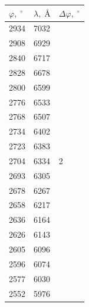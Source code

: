 \documentclass[a4paper]{article}
\renewcommand{\phi}{\varphi}
\newcommand{\angstrom}{\text{\AA}}
\begin{document}
	\begin{table}[h]
		\centering
	\begin{tabular}{|l|l|l|}
		\hline
		$\phi, \;^\circ$ & $\lambda, \;\angstrom$ & $\Delta \phi, \;^\circ$ \\ \hline
		2934             & 7032                   & \multirow{33}{*}{2}     \\ \cline{1-2}
		2908             & 6929                   &                         \\ \cline{1-2}
		2840             & 6717                   &                         \\ \cline{1-2}
		2828             & 6678                   &                         \\ \cline{1-2}
		2800             & 6599                   &                         \\ \cline{1-2}
		2776             & 6533                   &                         \\ \cline{1-2}
		2768             & 6507                   &                         \\ \cline{1-2}
		2734             & 6402                   &                         \\ \cline{1-2}
		2723             & 6383                   &                         \\ \cline{1-2}
		2704             & 6334                   &                         \\ \cline{1-2}
		2693             & 6305                   &                         \\ \cline{1-2}
		2678             & 6267                   &                         \\ \cline{1-2}
		2658             & 6217                   &                         \\ \cline{1-2}
		2636             & 6164                   &                         \\ \cline{1-2}
		2626             & 6143                   &                         \\ \cline{1-2}
		2605             & 6096                   &                         \\ \cline{1-2}
		2596             & 6074                   &                         \\ \cline{1-2}
		2577             & 6030                   &                         \\ \cline{1-2}
		2552             & 5976                   &                         \\ \cline{1-2}

\end{tabular}
\end{table}
\end{document}
